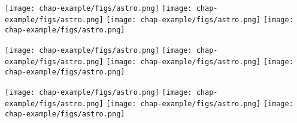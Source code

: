 \documentclass[varwidth]{standalone}
\begin{document}
\begin{minipage}{\linewidth}
    \\
    \centering
    \texttt{[image: chap-example/figs/astro.png]}
    \hfill
    \texttt{[image: chap-example/figs/astro.png]}
    \hfill
    \texttt{[image: chap-example/figs/astro.png]}
    \hfill
    \texttt{[image: chap-example/figs/astro.png]}

    \texttt{[image: chap-example/figs/astro.png]}
    \hfill
    \texttt{[image: chap-example/figs/astro.png]}
    \hfill
    \texttt{[image: chap-example/figs/astro.png]}
    \hfill
    \texttt{[image: chap-example/figs/astro.png]}

    \texttt{[image: chap-example/figs/astro.png]}
    \hfill
    \texttt{[image: chap-example/figs/astro.png]}
    \hfill
    \texttt{[image: chap-example/figs/astro.png]}
    \hfill
    \texttt{[image: chap-example/figs/astro.png]}
\end{minipage}
\end{document}
